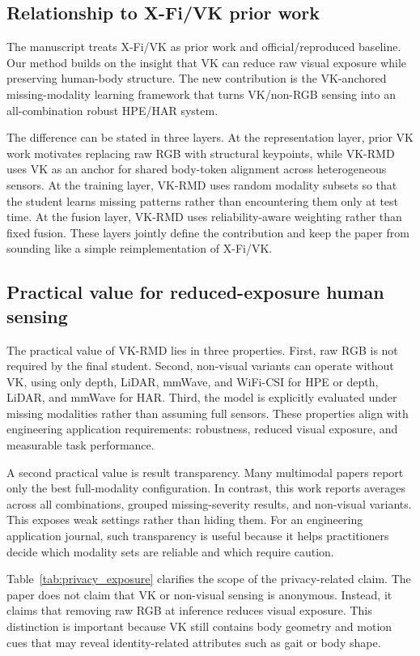 \documentclass[preprint,12pt]{elsarticle}
\newcommand{\method}{VK-RMD}
\begin{document}
\subsection{Relationship to X-Fi/VK prior work}

The manuscript treats X-Fi/VK as prior work and official/reproduced baseline. Our method builds on the insight that VK can reduce raw visual exposure while preserving human-body structure. The new contribution is the VK-anchored missing-modality learning framework that turns VK/non-RGB sensing into an all-combination robust HPE/HAR system.

The difference can be stated in three layers. At the representation layer, prior VK work motivates replacing raw RGB with structural keypoints, while \method{} uses VK as an anchor for shared body-token alignment across heterogeneous sensors. At the training layer, \method{} uses random modality subsets so that the student learns missing patterns rather than encountering them only at test time. At the fusion layer, \method{} uses reliability-aware weighting rather than fixed fusion. These layers jointly define the contribution and keep the paper from sounding like a simple reimplementation of X-Fi/VK.

\subsection{Practical value for reduced-exposure human sensing}

The practical value of \method{} lies in three properties. First, raw RGB is not required by the final student. Second, non-visual variants can operate without VK, using only depth, LiDAR, mmWave, and WiFi-CSI for HPE or depth, LiDAR, and mmWave for HAR. Third, the model is explicitly evaluated under missing modalities rather than assuming full sensors. These properties align with engineering application requirements: robustness, reduced visual exposure, and measurable task performance.

A second practical value is result transparency. Many multimodal papers report only the best full-modality configuration. In contrast, this work reports averages across all combinations, grouped missing-severity results, and non-visual variants. This exposes weak settings rather than hiding them. For an engineering application journal, such transparency is useful because it helps practitioners decide which modality sets are reliable and which require caution.

Table~\ref{tab:privacy_exposure} clarifies the scope of the privacy-related claim. The paper does not claim that VK or non-visual sensing is anonymous. Instead, it claims that removing raw RGB at inference reduces visual exposure. This distinction is important because VK still contains body geometry and motion cues that may reveal identity-related attributes such as gait or body shape.
\end{document}
